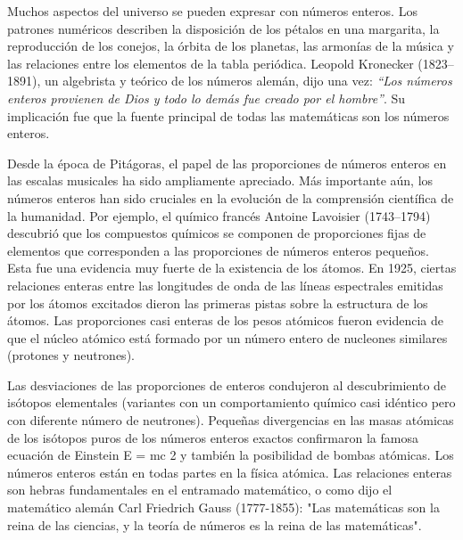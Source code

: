 \documentclass{article}
\begin{document}
Muchos aspectos del universo se pueden expresar con números enteros. Los
patrones numéricos describen la disposición de los pétalos en una margarita, la
reproducción de los conejos, la órbita de los planetas, las armonías de la
música y las relaciones entre los elementos de la tabla periódica. Leopold
Kronecker (1823–1891), un algebrista y teórico de los números alemán, dijo una
vez: \textit{“Los números enteros provienen de Dios y todo lo demás fue creado por el
hombre”}. Su implicación fue que la fuente principal de todas las matemáticas son
los números enteros.

Desde la época de Pitágoras, el papel de las proporciones de números enteros en
las escalas musicales ha sido ampliamente apreciado. Más importante aún, los
números enteros han sido cruciales en la evolución de la comprensión científica
de la humanidad. Por ejemplo, el químico francés Antoine Lavoisier (1743–1794)
descubrió que los compuestos químicos se componen de proporciones fijas de
elementos que corresponden a las proporciones de números enteros pequeños. Esta
fue una evidencia muy fuerte de la existencia de los átomos. En 1925, ciertas
relaciones enteras entre las longitudes de onda de las líneas espectrales
emitidas por los átomos excitados dieron las primeras pistas sobre la estructura
de los átomos. Las proporciones casi enteras de los pesos atómicos fueron
evidencia de que el núcleo atómico está formado por un número entero de
nucleones similares (protones y neutrones).

Las desviaciones de las proporciones de enteros condujeron al descubrimiento de
isótopos elementales (variantes con un comportamiento químico casi idéntico pero
con diferente número de neutrones). Pequeñas divergencias en las masas atómicas
de los isótopos puros de los números enteros exactos confirmaron la famosa
ecuación de Einstein E = mc 2 y también la posibilidad de bombas atómicas. Los
números enteros están en todas partes en la física atómica. Las relaciones
enteras son hebras fundamentales en el entramado matemático, o como dijo el
matemático alemán Carl Friedrich Gauss (1777-1855): "Las matemáticas son la
reina de las ciencias, y la teoría de números es la reina de las matemáticas".
\end{document}

